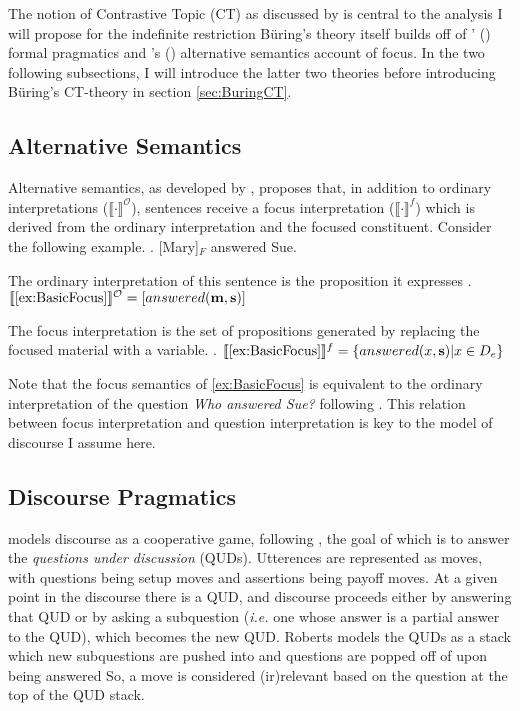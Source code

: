 \documentclass[GPFinal]{subfiles}
\begin{document}
The notion of Contrastive Topic (CT) as discussed by \textcite{buring2003d,buringforthcomingtopic} is central to the analysis I will propose for the indefinite restriction  
B\"uring's theory itself builds off of \citeauthor{roberts2012information}' (\citeyear{roberts2012information}) formal pragmatics and \citeauthor{rooth1992theory}'s (\citeyear{rooth1992theory}) alternative semantics account of focus.
In the two following subsections, I will introduce the latter two theories before introducing B\"uring's CT-theory in section \ref{sec:BuringCT}.

\subsection{Alternative Semantics \parencite{rooth1992theory}}
Alternative semantics, as developed by \textcite{rooth1992theory}, proposes that, in addition to ordinary interpretations ($\llbracket\cdot\rrbracket^\mathcal{O}$), sentences receive a focus interpretation ($\llbracket\cdot\rrbracket^f$) which is derived from the ordinary interpretation and the focused constituent.
Consider the following example.
\ex.\label{ex:BasicFocus} [Mary]$_F$ answered Sue.

The ordinary interpretation of this sentence is the proposition it expresses
\ex.\label{ex:OrdinaryInterpretation} $\llbracket\ref{ex:BasicFocus}\rrbracket^\mathcal{O} = [answered(\mathbf{m}, \mathbf{s})]$

The focus interpretation is the set of propositions generated by replacing the focused material with a variable.
\ex.\label{ex:FocusInterpretation} $\llbracket\ref{ex:BasicFocus}\rrbracket^f = \left\{ answered(x, \mathbf{s}) | x \in D_e \right\}$

Note that the focus semantics of \ref{ex:BasicFocus} is equivalent to the ordinary interpretation of the question \textit{Who answered Sue?} following \textcite{hamblin1973questions}. 
This relation between focus interpretation and question interpretation is key to the model of discourse I assume here.

\subsection{Discourse Pragmatics \parencite{roberts2012information}}
\textcite{roberts2012information} models discourse as a cooperative game, following \textcite{lewis1979scorekeeping}, the goal of which is to answer the \textit{questions under discussion} (QUDs).
Utterences are represented as moves, with questions being setup moves and assertions being payoff moves.
At a given point in the discourse there is a QUD, and discourse proceeds either by answering that QUD or by asking a subquestion (\textit{i.e.} one whose answer is a partial answer to the QUD), which becomes the new QUD.
Roberts models the QUDs as a stack which new subquestions are pushed into and questions are popped off of upon being answered
So, a move is considered (ir)relevant based on the question at the top of the QUD stack.
\end{document}
